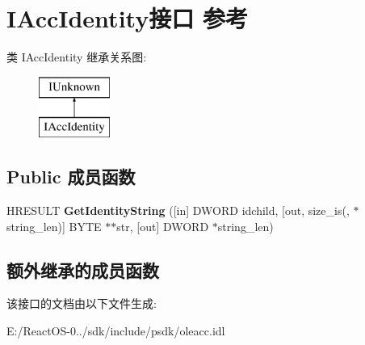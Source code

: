 \hypertarget{interface_i_acc_identity}{}\section{I\+Acc\+Identity接口 参考}
\label{interface_i_acc_identity}
类 I\+Acc\+Identity 继承关系图\+:\begin{figure}[H]
\begin{center}
\leavevmode
\includegraphics[height=2.000000cm]{interface_i_acc_identity}
\end{center}
\end{figure}
\subsection*{Public 成员函数}
\begin{DoxyCompactItemize}
\item 
\mbox{\label{interface_i_acc_identity_ae4d1f9511d749ad04cfa64d576efee16}} 
H\+R\+E\+S\+U\+LT {\bfseries Get\+Identity\+String} (\mbox{[}in\mbox{]} D\+W\+O\+RD idchild, \mbox{[}out, size\+\_\+is(, $\ast$string\+\_\+len)\mbox{]} B\+Y\+TE $\ast$$\ast$str, \mbox{[}out\mbox{]} D\+W\+O\+RD $\ast$string\+\_\+len)
\end{DoxyCompactItemize}
\subsection*{额外继承的成员函数}


该接口的文档由以下文件生成\+:\begin{DoxyCompactItemize}
\item 
E\+:/\+React\+O\+S-\/0../sdk/include/psdk/oleacc.\+idl\end{DoxyCompactItemize}
